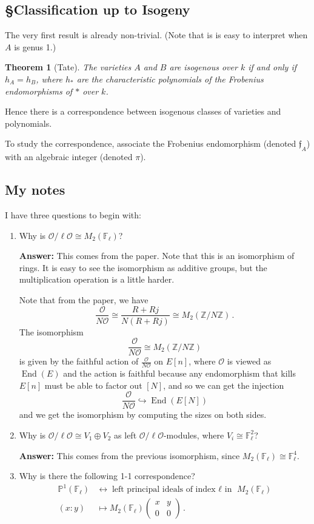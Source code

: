 \documentclass{amsart}
\newtheorem{theorem}{Theorem}[section]
\theoremstyle{definition}\newtheorem*{defn}{Definition}
\theoremstyle{definition}\newtheorem*{eg}{Example}
\DeclareMathOperator{\End}{End}
\newcommand{\F}{\mathbb{F}}
\renewcommand{\O}{\mathcal{O}}
\renewcommand{\P}{\mathbb{P}}
\newcommand{\Z}{\mathbb{Z}}
\begin{document}
\subsection*{\S\hspace{0.5cm}Classification up to Isogeny}
The very first result is already non-trivial. (Note that is is easy to interpret when $A$ is genus 1.)
\begin{theorem}[Tate]
The varieties $A$ and $B$ are isogenous over $k$ if and only if $h_A=h_B$, where $h_{*}$ are the characteristic polynomials of the Frobenius endomorphisms of $*$ over $k$.
\end{theorem}

Hence there is a correspondence between isogenous classes of varieties and polynomials.

To study the correspondence, associate the Frobenius endomorphism (denoted $\mathfrak{f}_A$) with an algebraic integer (denoted $\pi$).

\newpage
\subsection*{My notes}
I have three questions to begin with:
\begin{enumerate}
\item Why is $\O/\ell\O\cong M_2(\F_{\ell})$?

\noindent\textbf{Answer:} This comes from the paper. Note that this is an isomorphism of rings. It is easy to see the isomorphism as additive groups, but the multiplication operation is a little harder.

\medskip

Note that from the paper, we have 
\[\frac{\O}{N\O}\cong\frac{R+Rj}{N(R+Rj)}\cong M_2(\Z/N\Z)\,.\]
The isomorphism 
\[\frac{\O}{N\O}\cong M_2(\Z/N\Z)\]
is given by the faithful action of $\frac{\O}{N\O}$ on $E[n]$, where $\O$ is viewed as $\End(E)$ and the action is faithful because any endomorphism that kills $E[n]$ must be able to factor out $[N]$, and so we can get the injection
\[\frac{\O}{N\O}\hookrightarrow \End(E[N])\]
and we get the isomorphism by computing the sizes on both sides.

\item Why is $\O/\ell\O\cong V_1\oplus V_2$ as left $\O/\ell\O$-modules, where $V_i\cong\F_{\ell}^2$?

\noindent\textbf{Answer:} This comes from the previous isomorphism, since $M_2(\F_{\ell})\cong \F_{\ell}^4$.
\item Why is there the following 1-1 correspondence?
\begin{align*}
\P^{1}(\F_{\ell})	&\leftrightarrow	\text{left principal ideals of index $\ell$ in }M_2(\F_{\ell})\\
(x:y)					&\mapsto			M_2(\F_{\ell})\begin{pmatrix}x&y\\0&0\end{pmatrix}\,.
\end{align*}
\end{enumerate}
\end{document}
